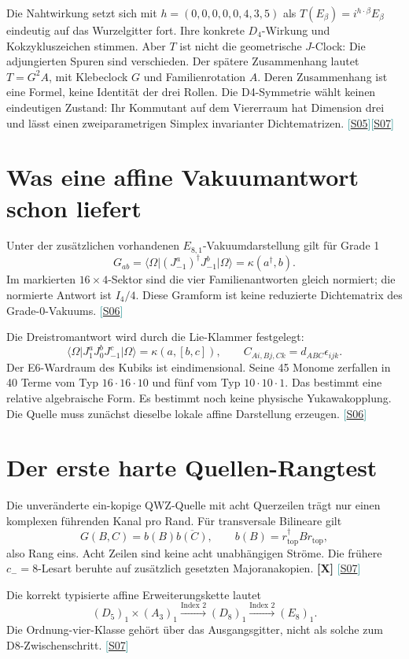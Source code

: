 \documentclass[11pt,a4paper,oneside,parskip=half,headings=normal,numbers=noenddot,bibliography=totoc]{scrreprt}
\newcommand{\ket}[1]{\lvert #1\rangle}
\newcommand{\bra}[1]{\langle #1\rvert}
\newcommand{\src}[1]{\textcolor{teal}{\small[\hyperref[s:#1]{S#1}]}}
\newcommand{\st}[1]{\textsf{\textbf{[#1]}}}
\begin{document}
Die Nahtwirkung setzt sich mit $h=(0,0,0,0,0,4,3,5)$ als $T(E_\beta)=i^{h\cdot\beta}E_\beta$ eindeutig auf das Wurzelgitter fort. Ihre konkrete $D_4$-Wirkung und Kokzykluszeichen stimmen. Aber $T$ ist nicht die geometrische $J$-Clock: Die adjungierten Spuren sind verschieden. Der spätere Zusammenhang lautet $T=G^2A$, mit Klebeclock $G$ und Familienrotation $A$. Deren Zusammenhang ist eine Formel, keine Identität der drei Rollen. Die D4-Symmetrie wählt keinen eindeutigen Zustand: Ihr Kommutant auf dem Viererraum hat Dimension drei und lässt einen zweiparametrigen Simplex invarianter Dichtematrizen. \src{05}\src{07}

\section{Was eine affine Vakuumantwort schon liefert}
Unter der zusätzlichen vorhandenen $E_{8,1}$-Vakuumdarstellung gilt für Grade 1
\[
 G_{ab}=\bra\Omega(J^a_{-1})^\dagger J^b_{-1}\ket\Omega
       =\kappa(a^\dagger,b).
\]
Im markierten $16\times4$-Sektor sind die vier Familienantworten gleich normiert; die normierte Antwort ist $I_4/4$. Diese Gramform ist keine reduzierte Dichtematrix des Grade-0-Vakuums. \src{06}

Die Dreistromantwort wird durch die Lie-Klammer festgelegt:
\[
 \bra\Omega J^a_1J^b_0J^c_{-1}\ket\Omega
 =\kappa(a,[b,c]),\qquad C_{Ai,Bj,Ck}=d_{ABC}\epsilon_{ijk}.
\]
Der E6-Wardraum des Kubiks ist eindimensional. Seine 45 Monome zerfallen in 40 Terme vom Typ $16\cdot16\cdot10$ und fünf vom Typ $10\cdot10\cdot1$. Das bestimmt eine relative algebraische Form. Es bestimmt noch keine physische Yukawakopplung. Die Quelle muss zunächst dieselbe lokale affine Darstellung erzeugen. \src{06}

\section{Der erste harte Quellen-Rangtest}
Die unveränderte ein-kopige QWZ-Quelle mit acht Querzeilen trägt nur einen komplexen führenden Kanal pro Rand. Für transversale Bilineare gilt
\[
 G(B,C)=b(B)\overline{b(C)},\qquad b(B)=r_{\mathrm{top}}^\dagger Br_{\mathrm{top}},
\]
also Rang eins. Acht Zeilen sind keine acht unabhängigen Ströme. Die frühere $c_-=8$-Lesart beruhte auf zusätzlich gesetzten Majoranakopien. \st{X} \src{07}

Die korrekt typisierte affine Erweiterungskette lautet
\[
 (D_5)_1\times(A_3)_1\xrightarrow{\text{Index }2}(D_8)_1
 \xrightarrow{\text{Index }2}(E_8)_1.
\]
Die Ordnung-vier-Klasse gehört über das Ausgangsgitter, nicht als solche zum D8-Zwischenschritt. \src{07}
\end{document}
